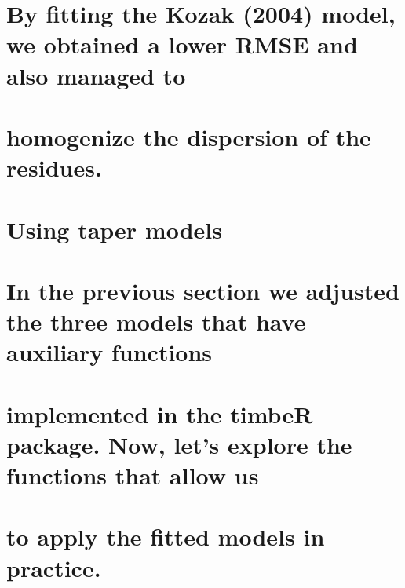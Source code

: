 \documentclass[
]{article}
\begin{document}
\hypertarget{by-fitting-the-kozak-2004-model-we-obtained-a-lower-rmse-and-also-managed-to}{%
\section{By fitting the Kozak (2004) model, we obtained a lower RMSE and
also managed
to}\label{by-fitting-the-kozak-2004-model-we-obtained-a-lower-rmse-and-also-managed-to}}

\hypertarget{homogenize-the-dispersion-of-the-residues.}{%
\section{homogenize the dispersion of the
residues.}\label{homogenize-the-dispersion-of-the-residues.}}

\hypertarget{section-2}{%
\section{}\label{section-2}}

\hypertarget{using-taper-models}{%
\section{Using taper models}\label{using-taper-models}}

\hypertarget{in-the-previous-section-we-adjusted-the-three-models-that-have-auxiliary-functions}{%
\section{In the previous section we adjusted the three models that have
auxiliary
functions}\label{in-the-previous-section-we-adjusted-the-three-models-that-have-auxiliary-functions}}

\hypertarget{implemented-in-the-timber-package.-now-lets-explore-the-functions-that-allow-us}{%
\section{implemented in the timbeR package. Now, let's explore the
functions that allow
us}\label{implemented-in-the-timber-package.-now-lets-explore-the-functions-that-allow-us}}

\hypertarget{to-apply-the-fitted-models-in-practice.}{%
\section{to apply the fitted models in
practice.}\label{to-apply-the-fitted-models-in-practice.}}
\end{document}
